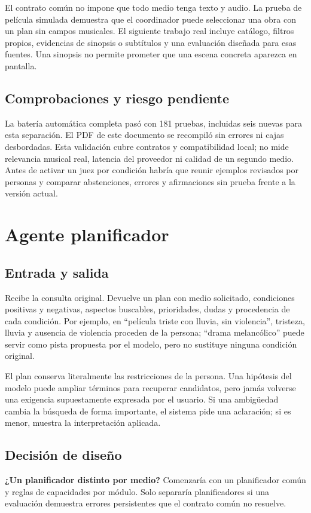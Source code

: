 \documentclass[11pt,a4paper]{article}
\begin{document}
El contrato común no impone que todo medio tenga texto y audio. La prueba de película simulada demuestra que el coordinador puede seleccionar una obra con un plan sin campos musicales. El siguiente trabajo real incluye catálogo, filtros propios, evidencias de sinopsis o subtítulos y una evaluación diseñada para esas fuentes. Una sinopsis no permite prometer que una escena concreta aparezca en pantalla.

\subsection{Comprobaciones y riesgo pendiente}
La batería automática completa pasó con 181 pruebas, incluidas seis nuevas para esta separación. El PDF de este documento se recompiló sin errores ni cajas desbordadas. Esta validación cubre contratos y compatibilidad local; no mide relevancia musical real, latencia del proveedor ni calidad de un segundo medio. Antes de activar un juez por condición habría que reunir ejemplos revisados por personas y comparar abstenciones, errores y afirmaciones sin prueba frente a la versión actual.

\section{Agente planificador}
\subsection{Entrada y salida}
Recibe la consulta original. Devuelve un plan con medio solicitado, condiciones positivas y negativas, aspectos buscables, prioridades, dudas y procedencia de cada condición. Por ejemplo, en ``película triste con lluvia, sin violencia'', tristeza, lluvia y ausencia de violencia proceden de la persona; ``drama melancólico'' puede servir como pista propuesta por el modelo, pero no sustituye ninguna condición original.

El plan conserva literalmente las restricciones de la persona. Una hipótesis del modelo puede ampliar términos para recuperar candidatos, pero jamás volverse una exigencia supuestamente expresada por el usuario. Si una ambigüedad cambia la búsqueda de forma importante, el sistema pide una aclaración; si es menor, muestra la interpretación aplicada.

\subsection{Decisión de diseño}
\textbf{¿Un planificador distinto por medio?} Comenzaría con un planificador común y reglas de capacidades por módulo. Solo separaría planificadores si una evaluación demuestra errores persistentes que el contrato común no resuelve.
\end{document}
